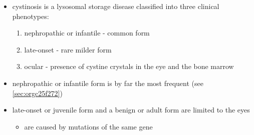 \documentclass{scrartcl}
\begin{document}
\begin{itemize}
\item cystinosis is a lysosomal storage disease classified into three
clinical phenotypes:
\begin{enumerate}
\item nephropathic or infantile - common form
\item late-onset - rare milder form
\item ocular - presence of cystine crystals in the eye and the bone
marrow
\end{enumerate}
\item nephropathic or infantile form is by far the most frequent (see \ref{sec:orgc25f272})
\item late-onset or juvenile form and a benign or adult form are limited to the eyes
\begin{itemize}
\item are caused by mutations of the same gene
\end{itemize}
\end{itemize}
\end{document}
